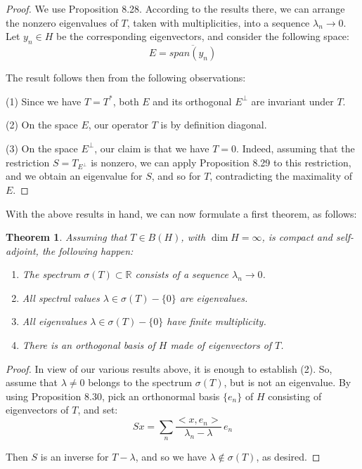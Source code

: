 \documentclass[12pt]{amsbook}
\newtheorem{theorem}{Theorem}[chapter]
\begin{document}
\begin{proof}
We use Proposition 8.28. According to the results there, we can arrange the nonzero eigenvalues of $T$, taken with multiplicities, into a sequence $\lambda_n\to0$. Let $y_n\in H$ be the corresponding eigenvectors, and consider the following space:
$$E=\overline{span(y_n)}$$

The result follows then from the following observations:

\medskip

(1) Since we have $T=T^*$, both $E$ and its orthogonal $E^\perp$ are invariant under $T$. 

\medskip

(2) On the space $E$, our operator $T$ is by definition diagonal.

\medskip

(3) On the space $E^\perp$, our claim is that we have $T=0$. Indeed, assuming that the restriction $S=T_{E^\perp}$ is nonzero, we can apply Proposition 8.29 to this restriction, and we obtain an eigenvalue for $S$, and so for $T$, contradicting the maximality of $E$.
\end{proof}

With the above results in hand, we can now formulate a first theorem, as follows:


\begin{theorem}
Assuming that $T\in B(H)$, with $\dim H=\infty$, is compact and self-adjoint, the following happen:
\begin{enumerate}
\item The spectrum $\sigma(T)\subset\mathbb R$ consists of a sequence $\lambda_n\to0$.

\item All spectral values $\lambda\in\sigma(T)-\{0\}$ are eigenvalues.

\item All eigenvalues $\lambda\in\sigma(T)-\{0\}$ have finite multiplicity.

\item There is an orthogonal basis of $H$ made of eigenvectors of $T$.
\end{enumerate}
\end{theorem}

\begin{proof}
In view of our various results above, it is enough to establish (2). So, assume that $\lambda\neq0$ belongs to the spectrum $\sigma(T)$, but is not an eigenvalue. By using Proposition 8.30, pick an orthonormal basis $\{e_n\}$ of $H$ consisting of eigenvectors of $T$, and set:
$$Sx=\sum_n\frac{<x,e_n>}{\lambda_n-\lambda}\,e_n$$

Then $S$ is an inverse for $T-\lambda$, and so we have $\lambda\notin\sigma(T)$, as desired.
\end{proof}
\end{document}
